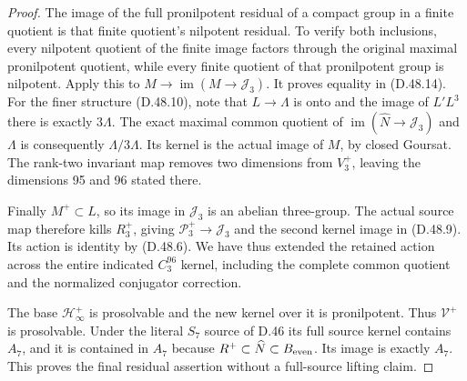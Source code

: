 \begin{proof}
The image of the full pronilpotent residual of a compact
group in a finite quotient is that finite quotient's
nilpotent residual. To verify both inclusions, every
nilpotent quotient of the finite image factors through
the original maximal pronilpotent quotient, while
every finite quotient of that pronilpotent group is
nilpotent. Apply this to \(M\to\operatorname{im}(M\to
\mathcal J_3)\). It proves equality in (D.48.14).
For the finer structure (D.48.10), note that
\(L\to\Lambda\) is onto and the image of
\(L'L^3\) there is exactly \(3\Lambda\).
The exact maximal common quotient of
\(\operatorname{im}(\widehat N\to\mathcal J_3)\)
and \(\Lambda\) is consequently
\(\Lambda/3\Lambda\). Its kernel is the actual image
of \(M\), by closed Goursat. The rank-two invariant
map removes two dimensions from \(V_3^+\), leaving
the dimensions 95 and 96 stated there.

Finally \(M^+\subset L\), so its image in
\(\mathcal J_3\) is an abelian three-group. The actual
source map therefore kills \(R_3^+\), giving
\(\mathcal P_3^+\to\mathcal J_3\) and the second
kernel image in (D.48.9). Its action is identity by
(D.48.6). We have thus extended the retained action
across the entire indicated \(C_3^{96}\) kernel,
including the complete common quotient and the
normalized conjugator correction.

The base \(\mathcal H^+_\infty\) is prosolvable and
the new kernel over it is pronilpotent. Thus
\(\mathcal V^+\) is prosolvable. Under the literal
\(S_7\) source of D.46 its full source kernel contains
\(A_7\), and it is contained in \(A_7\) because
\(R^+\subset\widehat N\subset B_{\rm even}\).
Its image is exactly \(A_7\). This proves the final
residual assertion without a full-source lifting claim.
\end{proof}
